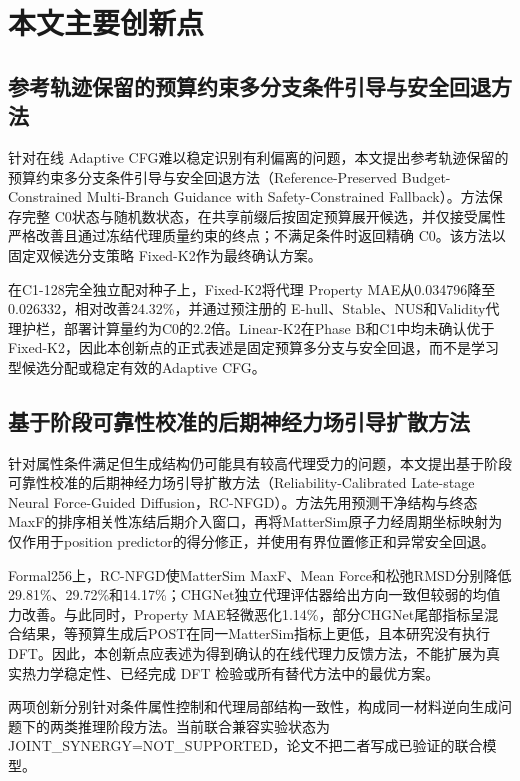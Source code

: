 \section{本文主要创新点}

\subsection{参考轨迹保留的预算约束多分支条件引导与安全回退方法}

针对在线 Adaptive CFG难以稳定识别有利偏离的问题，本文提出参考轨迹保留的预算约束多分支条件引导与安全回退方法（Reference-Preserved Budget-Constrained Multi-Branch Guidance with Safety-Constrained Fallback）。方法保存完整 C0状态与随机数状态，在共享前缀后按固定预算展开候选，并仅接受属性严格改善且通过冻结代理质量约束的终点；不满足条件时返回精确 C0。该方法以固定双候选分支策略 Fixed-K2作为最终确认方案。

在C1-128完全独立配对种子上，Fixed-K2将代理 Property MAE从0.034796降至0.026332，相对改善24.32\%，并通过预注册的 E-hull、Stable、NUS和Validity代理护栏，部署计算量约为C0的2.2倍。Linear-K2在Phase B和C1中均未确认优于Fixed-K2，因此本创新点的正式表述是固定预算多分支与安全回退，而不是学习型候选分配或稳定有效的Adaptive CFG。

\subsection{基于阶段可靠性校准的后期神经力场引导扩散方法}

针对属性条件满足但生成结构仍可能具有较高代理受力的问题，本文提出基于阶段可靠性校准的后期神经力场引导扩散方法（Reliability-Calibrated Late-stage Neural Force-Guided Diffusion，RC-NFGD）。方法先用预测干净结构与终态 MaxF的排序相关性冻结后期介入窗口，再将Matter\allowbreak Sim原子力经周期坐标映射为仅作用于position predictor的得分修正，并使用有界位置修正和异常安全回退。

Formal256上，RC-NFGD使Matter\allowbreak Sim MaxF、Mean Force和松弛RMSD分别降低29.81\%、29.72\%和14.17\%；CHGNet独立代理评估器给出方向一致但较弱的均值力改善。与此同时，Property MAE轻微恶化1.14\%，部分CHGNet尾部指标呈混合结果，等预算生成后POST在同一Matter\allowbreak Sim指标上更低，且本研究没有执行DFT。因此，本创新点应表述为得到确认的在线代理力反馈方法，不能扩展为真实热力学稳定性、已经完成 DFT 检验或所有替代方法中的最优方案。

两项创新分别针对条件属性控制和代理局部结构一致性，构成同一材料逆向生成问题下的两类推理阶段方法。当前联合兼容实验状态为 JOINT\_SYNERGY=NOT\_SUP\allowbreak PORTED，论文不把二者写成已验证的联合模型。

